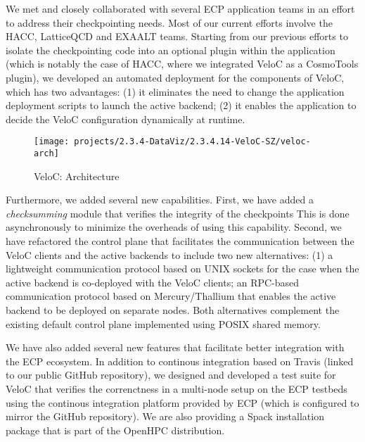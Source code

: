 We met and closely collaborated with several ECP application teams in
an effort to address their checkpointing needs. Most of our current
efforts involve the HACC, LatticeQCD and EXAALT teams. Starting from
our previous efforts to isolate the checkpointing code into an optional
plugin within the application (which is notably the case of HACC, where
we integrated VeloC as a CosmoTools plugin), we developed an automated
deployment for the components of VeloC, which has two advantages: (1)
it eliminates the need to change the application deployment scripts
to launch the active backend; (2) it enables the application to decide
the VeloC configuration dynamically at runtime.

\begin{wrapfigure}{l}{0.47\textwidth}
  \texttt{[image: projects/2.3.4-DataViz/2.3.4.14-VeloC-SZ/veloc-arch]}
  \caption{VeloC: Architecture}%
  \label{fig:veloc:arch}%
\end{wrapfigure}

Furthermore, we added several new capabilities. First, we have added
a \emph{checksumming} module that verifies the integrity of the checkpoints
This is done asynchronously to minimize the overheads of using this capability.
Second, we have refactored the control plane that facilitates the communication
between the VeloC clients and the active backends to include two new alternatives:
(1) a lightweight communication protocol based on UNIX sockets for the case
when the active backend is co-deployed with the VeloC clients; an RPC-based
communication protocol based on Mercury/Thallium that enables the active
backend to be deployed on separate nodes. Both alternatives complement the
existing default control plane implemented using POSIX shared memory.

We have also added several new features that facilitate better
integration with the ECP ecosystem. In addition to continous
integration based on Travis (linked to our public GitHub repository),
we designed and developed a test suite for VeloC that verifies the
correnctness in a multi-node setup on the ECP testbeds using the
continous integration platform provided by ECP (which is configured to
mirror the GitHub repository). We are also providing a Spack
installation package that is part of the OpenHPC distribution.

